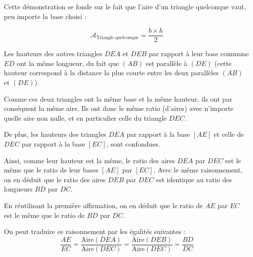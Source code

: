 \documentclass[a4paper, twoside]{article}
\begin{document}
Cette démonstration se fonde sur le fait que l'aire
d'un triangle quelconque vaut,
peu importe la base choisi :

$$ \mathcal{A}_{\text{Triangle quelconque}} = \frac{b \times h}{2} $$

Les hauteurs des autres triangles $DEA$ et $DEB$ par rapport à
leur base commune $ED$ ont la même longueur,
du fait que $(AB)$ est parallèle à $(DE)$
(cette hauteur correspond à la distance la plus courte
entre les deux parallèles $(AB)$ et $(DE)$).

Comme ces deux triangles ont la même base et la même hauteur,
ils ont par conséquent la même aire.
Ils ont donc le même ratio (d'aires) avec n'importe quelle aire non nulle,
et en particulier celle du triangle $DEC$.

\medbreak

De plus, les hauteurs des triangles
$DEA$ par rapport à la base $[AE]$ et
celle de $DEC$ par rapport à la base $[EC]$,
sont confondues.

Ainsi, comme leur hauteur est la même,
le ratio des aires $DEA$ par $DEC$ est le même que
le ratio de leur bases $[AE]$ par $[EC]$.
Avec le même raisonnement, on en déduit que
le ratio des aires $DEB$ par $DEC$ est identique
au ratio des longueurs $BD$ par $DC$.

\medbreak

En réutilisant la première affirmation,
on en déduit que
le ratio de $AE$ par $EC$ est le même que
le ratio de $BD$ par $DC$.

\medbreak

On peut traduire ce raisonnement par les égalités suivantes :
$$\frac{AE}{EC} = \frac{{\text{Aire}}(DEA)}{{\text{Aire}}(DEC)}
	= \frac{{\text{Aire}}(DEB)}{{\text{Aire}}(DEC)}
	= \frac{BD}{DC}$$

\medbreak
\end{document}

